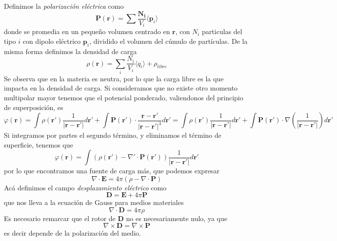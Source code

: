 ﻿\documentclass{article}
\numberwithin{equation}{section} %
\renewcommand{\vec}[1]{\boldsymbol{#1}}
\newcommand{\rinv}{\frac{1}{|\vec{r} - \vec{r}'|}}
\newcommand{\Rinv}{\frac{\vec{r} - \vec{r}'}{|\vec{r} - \vec{r}'|^3}}
\begin{document}
Definimos la \emph{polarización eléctrica} como
\begin{equation}
\vec{P}(\vec{r}) = \sum \frac{\vec{N_i}}{V_i} \langle \vec{p}_i \rangle
\end{equation}
donde se promedia en un pequeño volumen centrado en $\vec{r}$, con $N_i$ particulas del tipo $i$ con dipolo eléctrico $\vec{p}_i$, dividido el volumen del cúmulo de partículas. De la misma forma definimos la densidad de carga
\begin{equation}
\rho(\vec{r}) = \sum_i \frac{N_i}{V_i} \langle q_i \rangle + \rho_{libre}
\end{equation}
Se observa que en la materia es neutra, por lo que la carga libre es la que impacta en la densidad de carga. 
Si consideramos que no existe otro momento multipolar mayor tenemos que el potencial ponderado, valiendonos del principio de superposición, es
\begin{equation*}
 \varphi(\vec{r}) = \int \rho(\vec{r}') \rinv d\vec{r}' + \int \vec{P}(\vec{r}') \cdot \Rinv d\vec{r}' = \int \rho(\vec{r}') \rinv d\vec{r}' + \int \vec{P}(\vec{r}') \cdot \nabla\left(\rinv\right) d\vec{r}' 
\end{equation*}
Si integramos por partes el segundo término, y eliminamos el término de superficie, tenemos que
\begin{equation}
\varphi(\vec{r}) = \int (\rho(\vec{r}') - \nabla' \cdot \vec{P}(\vec{r}')) \rinv d\vec{r'}
\end{equation}
por lo que encontramos una fuente de carga más, que podemos expresar
\begin{equation*}
\nabla \cdot \vec{E} = 4\pi (\rho - \nabla \cdot \vec{P})
\end{equation*}
Acá definimos el campo \emph{desplazamiento eléctrico} como 
\begin{equation}
 \vec{D} = \vec{E} + 4\pi \vec{P} 
\end{equation}
que nos lleva a la ecuación de Gauss para medios materiales
\begin{equation}
 \nabla \cdot \vec{D} = 4\pi \rho
\end{equation}
Es necesario remarcar que el rotor de $\vec{D}$ no es necesariamente nulo, ya que
\begin{equation}
\nabla \times \vec{D} = \nabla \times \vec{P}
\end{equation}
es decir depende de la polarización del medio.
\end{document}
